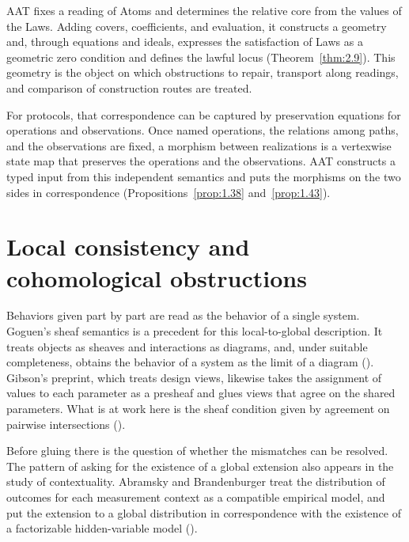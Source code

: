 AAT fixes a reading of Atoms and determines the relative core from the values of the Laws.
Adding covers, coefficients, and evaluation, it constructs a geometry and, through equations
and ideals, expresses the satisfaction of Laws as a geometric zero condition and defines the
lawful locus (Theorem~\ref{thm:2.9}).
This geometry is the object on which obstructions to repair, transport along readings, and
comparison of construction routes are treated.

For protocols, that correspondence can be captured by preservation equations for operations
and observations. Once named operations, the relations among paths, and the observations are
fixed, a morphism between realizations is a vertexwise state map that preserves the
operations and the observations. AAT constructs a typed input from this independent
semantics and puts the morphisms on the two sides in correspondence
(Propositions~\ref{prop:1.38} and~\ref{prop:1.43}).

\section{Local consistency and cohomological obstructions}\label{sec:R.2}

Behaviors given part by part are read as the behavior of a single system.
Goguen's sheaf semantics is a precedent for this local-to-global description.
It treats objects as sheaves and interactions as diagrams, and, under suitable completeness,
obtains the behavior of a system as the limit of a diagram
(\cite[\href{https://ncatlab.org/nlab/files/Goguen-SheafSemantics.pdf}{public manuscript, \S\S2, 3.1--3.3, Proposition 26}]{Goguen92}).
Gibson's preprint, which treats design views, likewise takes the assignment of values to
each parameter as a presheaf and glues views that agree on the shared parameters. What is at
work here is the sheaf condition given by agreement on pairwise intersections
(\cite[\href{https://arxiv.org/html/2605.08609v1}{Definition 3.2, Theorem 4.1, \S\S3--5}]{Gibson26}).

Before gluing there is the question of whether the mismatches can be resolved.
The pattern of asking for the existence of a global extension also appears in the study of
contextuality. Abramsky and Brandenburger treat the distribution of outcomes for each
measurement context as a compatible empirical model, and put the extension to a global
distribution in correspondence with the existence of a factorizable hidden-variable model
(\cite[\href{https://arxiv.org/pdf/1102.0264v7}{\S\S2.2--2.5, Theorem 8.1}]{AB11}).

